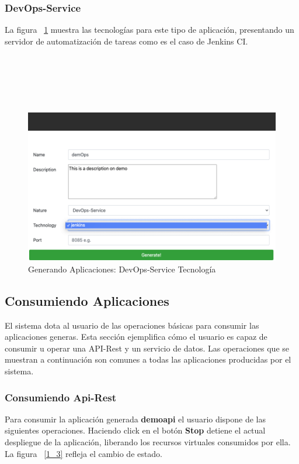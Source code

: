 \documentclass[a4paper,11pt]{book}
\begin{document}
\subsubsection{DevOps-Service}

La figura ~\ref{21} muestra las tecnologías para este tipo de aplicación, presentando un servidor de automatización de tareas como es el caso de Jenkins CI. 
~\\
~\\
~\\
~\\
~\\
~\\

\begin{figure}[H]
\centering
\includegraphics[scale=0.45]{imagenes/casouso_a/21.png}
\caption{ Generando Aplicaciones: DevOps-Service Tecnología}
\label{21}
\end{figure}



\subsection{Consumiendo Aplicaciones}

El sistema dota al usuario de las operaciones básicas para consumir las aplicaciones generas. Esta sección ejemplifica cómo el usuario es capaz de consumir u operar una API-Rest y un servicio de datos. Las operaciones que se muestran a continuación son comunes a todas las aplicaciones producidas por el sistema. 

\subsubsection{Consumiendo Api-Rest}
Para consumir la aplicación generada \textbf{demoapi} el usuario dispone de las siguientes operaciones. Haciendo click en el botón \textbf{Stop} detiene el actual despliegue de la aplicación, liberando los recursos virtuales consumidos por ella. La figura ~\ref{1_3}  refleja el cambio de estado.
~\\
~\\
~\\
~\\
~\\
~\\
\end{document}
